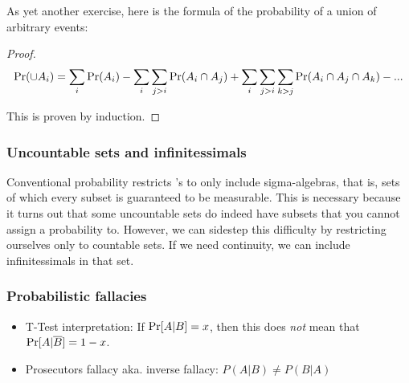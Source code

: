 As yet another exercise, here is the formula of the probability of a union of arbitrary events: 

\begin{proof}
    $$ \operatorname{Pr} (\cup A_i) = \sum_i \operatorname{Pr}(A_i) 
            - \sum_i \sum_{j>i} \operatorname{Pr}(A_i \cap A_j) 
            + \sum_i \sum_{j>i} \sum_{k>j} \operatorname{Pr}(A_i \cap A_j \cap A_k) 
            - ...  $$
    
    This is proven by induction. 
                
    
    
\end{proof}


\subsubsection{Uncountable sets and infinitessimals}

Conventional probability restricts \samplespace 's to only include sigma-algebras, that is, sets of which every subset is guaranteed to be measurable. This is necessary because it turns out that some uncountable sets do indeed have subsets that you cannot assign a probability to. However, we can sidestep this difficulty by restricting ourselves only to countable sets. If we need continuity, we can include infinitessimals in that set.

 
 
 
 
 \subsubsection{Probabilistic fallacies}
 \begin{itemize}
     \item T-Test interpretation: If $\operatorname{Pr}[A|B] = x$, then this does \emph{not} mean that $\operatorname{Pr}[A|\overline{B}] = 1 - x$.
     \item Prosecutors fallacy aka. inverse fallacy: $P(A|B) \neq P(B|A)$
 \end{itemize}

